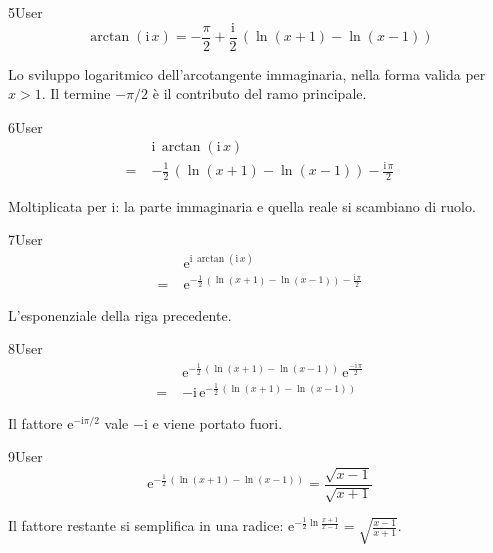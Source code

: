 \begin{espr}{5}{User}{\verificata}
\[
\arctan\!\left(\mathrm{i}\, x\right) = -\frac{\pi}{2} + \frac{\mathrm{i}}{2}\, \left(\ln\!\left(x + 1\right) - \ln\!\left(x - 1\right)\right)
\]
\end{espr}
Lo sviluppo logaritmico dell'arcotangente immaginaria, nella forma valida per $x>1$. Il termine $-\pi/2$ è il contributo del ramo principale.

\begin{espr}{6}{User}{\verificata}
\begin{align*}
& \mathrm{i}\, \arctan\!\left(\mathrm{i}\, x\right) \\
=\;& -\frac{1}{2}\, \left(\ln\!\left(x + 1\right) - \ln\!\left(x - 1\right)\right) - \frac{\mathrm{i}\, \pi}{2}
\end{align*}
\end{espr}
Moltiplicata per $\mathrm{i}$: la parte immaginaria e quella reale si scambiano di ruolo.

\begin{espr}{7}{User}{\verificata}
\begin{align*}
& \mathrm{e}^{\mathrm{i}\, \arctan\!\left(\mathrm{i}\, x\right)} \\
=\;& \mathrm{e}^{-\frac{1}{2}\, \left(\ln\!\left(x + 1\right) - \ln\!\left(x - 1\right)\right) - \frac{\mathrm{i}\, \pi}{2}}
\end{align*}
\end{espr}
L'esponenziale della riga precedente.

\begin{espr}{8}{User}{\verificata}
\begin{align*}
& \mathrm{e}^{-\frac{1}{2}\, \left(\ln\!\left(x + 1\right) - \ln\!\left(x - 1\right)\right)}\, \mathrm{e}^{\frac{-\mathrm{i}\, \pi}{2}} \\
=\;& -\mathrm{i}\, \mathrm{e}^{-\frac{1}{2}\, \left(\ln\!\left(x + 1\right) - \ln\!\left(x - 1\right)\right)}
\end{align*}
\end{espr}
Il fattore $\mathrm{e}^{-\mathrm{i}\pi/2}$ vale $-\mathrm{i}$ e viene portato fuori.

\begin{espr}{9}{User}{\verificata}
\[
\mathrm{e}^{-\frac{1}{2}\, \left(\ln\!\left(x + 1\right) - \ln\!\left(x - 1\right)\right)} = \frac{\sqrt{x - 1}}{\sqrt{x + 1}}
\]
\end{espr}
Il fattore restante si semplifica in una radice: $\mathrm{e}^{-\frac12\ln\frac{x+1}{x-1}}=\sqrt{\frac{x-1}{x+1}}$.

